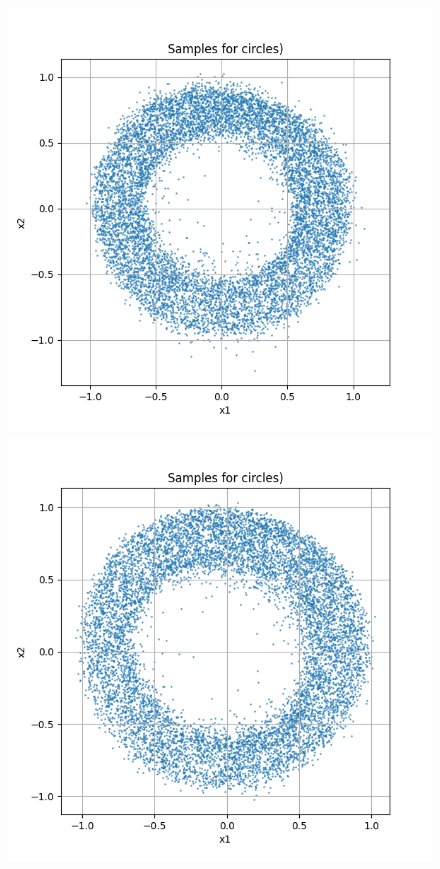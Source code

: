 \documentclass[a4paper,12pt]{article}
\begin{document}
\begin{figure}[h]
  \begin{minipage}{0.3\textwidth}
      \centering
      \includegraphics[width=\linewidth]{"images/Samples for ddpm_2_100_0.0001_0.02_circles.png"}
  \end{minipage}
  \begin{minipage}{0.3\textwidth}
      \centering
      \includegraphics[width=\linewidth]{"images/Samples for ddpm_2_150_0.0001_0.02_circles.png"}

\end{minipage}
\end{figure}
\end{document}
